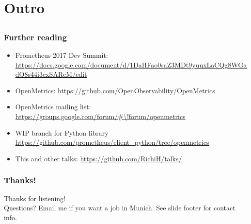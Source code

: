 \documentclass[aspectratio=169]{beamer}
\begin{document}
\section{Outro}

\subsection{}

\begin{frame}
	\frametitle{Further reading}
	\vfill
	\begin{itemize}
		\item Prometheus 2017 Dev Summit: \url{https://docs.google.com/document/d/1DaHFao0saZ3MDt9yuuxLaCQg8WGadO8s44i3cxSARcM/edit}
		\item OpenMetrics: \url{https://github.com/OpenObservability/OpenMetrics}
		\item OpenMetrics mailing list: \url{https://groups.google.com/forum/\#\!forum/openmetrics}
		\item WIP branch for Python library \url{https://github.com/prometheus/client\_python/tree/openmetrics}
		\item This and other talks: \url{https://github.com/RichiH/talks/}
	\end{itemize}
	\vfill
\end{frame}

\begin{frame}
	\frametitle{Thanks!}
		\begin{center}
			\vfill
			Thanks for listening!\\
			\vfill
			Questions?
			\vfill
			Email me if you want a job in Munich.
			\vfill
			See slide footer for contact info.
			\vfill
		\end{center}
\end{frame}
\end{document}
